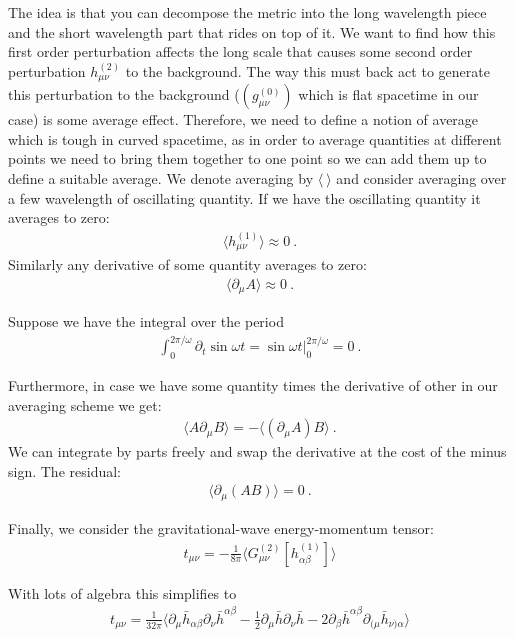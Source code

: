 \documentclass[11pt]{article}
\begin{document}
The idea is that you can decompose the metric into the long wavelength piece and the short wavelength part that rides on top of it. We want to find how this first order perturbation affects the long scale that causes some second order perturbation $ h^{(2)}_{\mu\nu}$ to the background. The way this must back act to generate this perturbation to the background ($(g^{(0)}_{\mu\nu})$ which is flat spacetime in our case) is some average effect. Therefore, we need to define a notion of average which is tough in curved spacetime, as in order to average quantities at different points we need to bring them together to one point so we can add them up to define a suitable average.
We denote averaging by $\langle \ \rangle$ and consider averaging over a few wavelength of oscillating quantity. If we have the oscillating quantity it averages to zero:
\begin{align}
\langle h^{(1)}_{\mu\nu}\rangle\approx 0 \ .
\end{align}
Similarly any derivative of some quantity averages to zero:
\begin{align}
\langle\partial_\mu A\rangle \approx 0 \ .
\end{align}

 \begin{example}
Suppose we have the integral over the period
  \begin{align}
 \int_{0}^{2\pi/\omega}\partial_t \sin\omega t = \sin \omega t \vert_{0}^{2\pi/\omega} = 0  \ . 
  \end{align}
\end{example}

Furthermore, in case we have some quantity times the derivative of other in our averaging scheme we get:
\begin{align}
\langle A\partial_\mu B\rangle = - \langle (\partial_\mu A)B\rangle \ .
\end{align}
We can integrate by parts freely and swap the derivative at the cost of the minus sign. The residual:
\begin{align}
\langle\partial_\mu (AB)\rangle = 0 \ .
\end{align}

Finally, we consider the gravitational-wave energy-momentum tensor:
\begin{align}
t_{\mu\nu}= -\frac{1}{8\pi}\langle G^{(2)}_{\mu\nu}[h^{(1)}_{\alpha\beta}]\rangle
\end{align}

With lots of algebra this simplifies to
\begin{align}
t_{\mu\nu}= \frac{1}{32\pi}\langle \partial_\mu \bar{h}_{\alpha\beta}\partial_\nu\bar{h}^{\alpha\beta}- \frac{1}{2}\partial_\mu\bar{h}\partial_\nu\bar{h}-2\partial_\beta\bar{h}^{\alpha\beta}\partial_{(\mu}\bar{h}_{\nu)\alpha} \rangle
\end{align}
\end{document}
